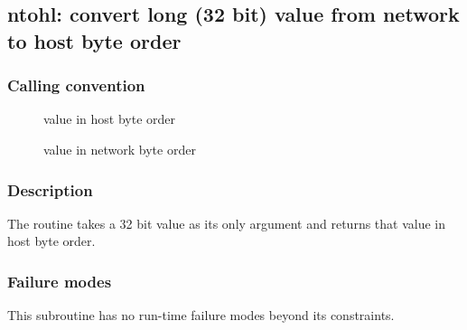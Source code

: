 \clearpage
{}
{}
\label{subr:ntohl}
\subsection*{ntohl: convert long (32 bit) value from network to host
  byte order}

\subsubsection*{Calling convention}

\begin{description}
\item[] value in host byte order
\item[] value in network byte order
\end{description}

\subsubsection*{Description}

The  routine takes a 32 bit value as its only
argument and returns that value in host byte order.

\subsubsection*{Failure modes}

This subroutine has no run-time failure modes beyond its constraints.
